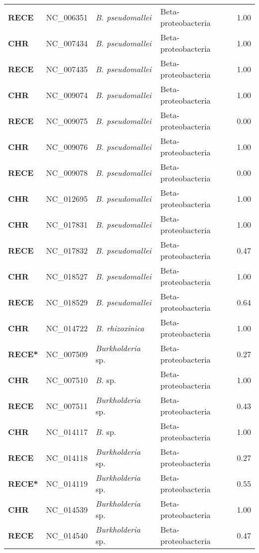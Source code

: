 \begin{adjustwidth}{-3cm}{2cm}
{\begin{supertabular}{>{\bfseries}l|p{0.1\textwidth}p{0.14\textwidth}l|l}
RECE & NC\_006351 & \textit{B. pseudomallei} & Beta-proteobacteria & 1.00\\
CHR & NC\_007434 & \textit{B. pseudomallei} & Beta-proteobacteria & 1.00\\
RECE & NC\_007435 & \textit{B. pseudomallei} & Beta-proteobacteria & 1.00\\
CHR & NC\_009074 & \textit{B. pseudomallei} & Beta-proteobacteria & 1.00\\
RECE & NC\_009075 & \textit{B. pseudomallei} & Beta-proteobacteria & 0.00\\
CHR & NC\_009076 & \textit{B. pseudomallei} & Beta-proteobacteria & 1.00\\
RECE & NC\_009078 & \textit{B. pseudomallei} & Beta-proteobacteria & 0.00\\
CHR & NC\_012695 & \textit{B. pseudomallei} & Beta-proteobacteria & 1.00\\
CHR & NC\_017831 & \textit{B. pseudomallei} & Beta-proteobacteria & 1.00\\
RECE & NC\_017832 & \textit{B. pseudomallei} & Beta-proteobacteria & 0.47\\
CHR & NC\_018527 & \textit{B. pseudomallei} & Beta-proteobacteria & 1.00\\
RECE & NC\_018529 & \textit{B. pseudomallei} & Beta-proteobacteria & 0.64\\
CHR & NC\_014722 & \textit{B. rhizoxinica} & Beta-proteobacteria & 1.00\\
RECE* & NC\_007509 & \textit{Burkholderia} sp. & Beta-proteobacteria & 0.27\\
CHR & NC\_007510 & \textit{B.} sp. & Beta-proteobacteria & 1.00\\
RECE & NC\_007511 & \textit{Burkholderia} sp. & Beta-proteobacteria & 0.43\\
CHR & NC\_014117 & \textit{B.} sp. & Beta-proteobacteria & 1.00\\
RECE & NC\_014118 & \textit{Burkholderia} sp. & Beta-proteobacteria & 0.27\\
RECE* & NC\_014119 & \textit{Burkholderia} sp. & Beta-proteobacteria & 0.55\\
CHR & NC\_014539 & \textit{Burkholderia}  sp.& Beta-proteobacteria & 1.00\\
RECE & NC\_014540 & \textit{Burkholderia} sp. & Beta-proteobacteria & 0.47\\

\end{supertabular}}
\end{adjustwidth}
